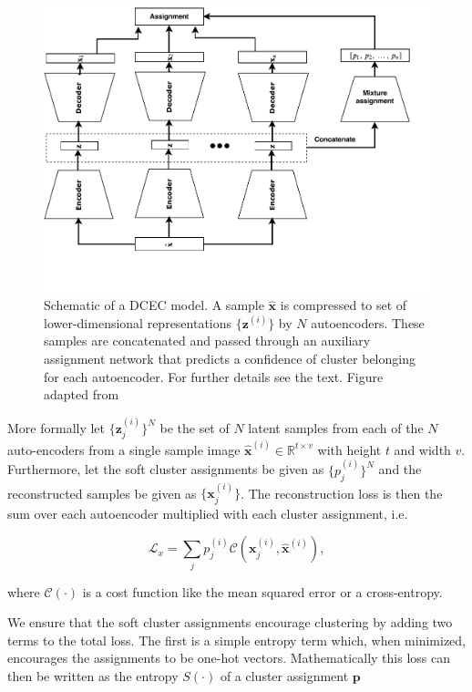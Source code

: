 \documentclass[preprint,12pt]{elsarticle}
\newcommand{\R}{\mathbb{R}}
\begin{document}
\begin{figure}[tb]
	\centering
	\includegraphics[width=\textwidth]{plots/mixae.pdf}
	\caption[Deep convolutional embedded clustering schematic]{Schematic of a DCEC model. A sample $\hat{\boldsymbol{x}}$ is compressed to set of lower-dimensional representations $\{\boldsymbol{z}^{(i)}\}$ by $N$ autoencoders. These samples are concatenated and passed through an auxiliary assignment network that predicts a confidence of cluster belonging for each autoencoder. For further details see the text. Figure adapted from \citet{Zhang}}
	\label{fig:mixae}
\end{figure}


More formally let $\{\boldsymbol{z}_j^{(i)}\}^N$ be the set of $N$ latent samples from each of the $N$ auto-encoders from a single sample image $\hat{\boldsymbol{x}}^{(i)} \in \R ^{t\times v}$ with height $t$ and width $v$. Furthermore, let the soft cluster assignments be given as $\{p_j^{(i)}\}^N$ and the reconstructed samples be given as $\{\boldsymbol{x}_j^{(i)}\}$. The reconstruction loss is then the sum over each autoencoder multiplied with each cluster assignment, i.e.

\begin{equation}\label{eq:mixae_reconst}
\mathcal{L}_x = \sum_j p_j^{(i)} \mathcal{C}(\boldsymbol{x}_j^{(i)}, \hat{\boldsymbol{x}}^{(i)}),
\end{equation}

\noindent where $\mathcal{C}(\cdot)$ is a cost function like the mean squared error or a cross-entropy.

We ensure that the soft cluster assignments encourage clustering by adding two terms to the total loss. The first is a simple entropy term which, when minimized, encourages the assignments to be one-hot vectors. Mathematically this loss can then be written as the entropy $S(\cdot)$ of a cluster assignment $\boldsymbol{p}$
\end{document}
